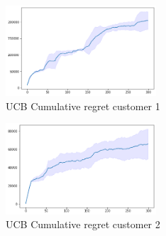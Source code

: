 \begin{multicols}{2}
    \begin{figure}[H]
        \begin{center}
        \includegraphics[width=0.5\textwidth]{img/ucb7_1cum_reg.png}
        \caption{UCB Cumulative regret customer 1}
        \label{fig:cum_reg71}
        \end{center}
    \end{figure}
    \columnbreak
    \begin{figure}[H]
        \begin{center}
        \includegraphics[width=0.5\textwidth]{img/ucb7_2cum_reg.png}
        \caption{UCB Cumulative regret customer 2}
        \label{fig:cum_reg72}
        \end{center}
    \end{figure}
\end{multicols}

